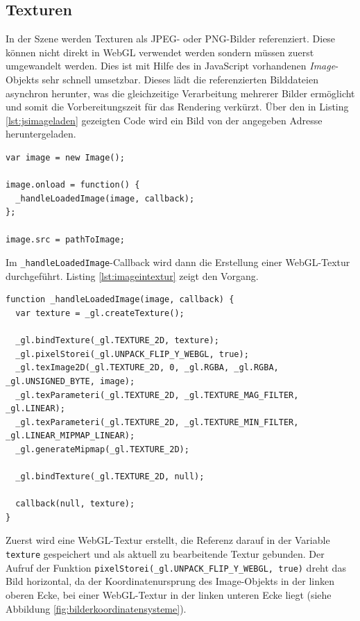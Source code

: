 \subsection{Texturen}
In der Szene werden Texturen als JPEG- oder PNG-Bilder referenziert. Diese können nicht direkt in WebGL verwendet werden sondern müssen zuerst umgewandelt werden. Dies ist mit Hilfe des in JavaScript vorhandenen \textit{Image}-Objekts sehr schnell umsetzbar. Dieses lädt die referenzierten Bilddateien asynchron herunter, was die gleichzeitige Verarbeitung mehrerer Bilder ermöglicht und somit die Vorbereitungszeit für das Rendering verkürzt. Über den in Listing \ref{lst:jsimageladen} gezeigten Code wird ein Bild von der angegeben Adresse heruntergeladen.
\lstset{language=JavaScript}
\begin{lstlisting}[caption={Herunterladen eines Bildes mit dem JavaScript Image-Objekt}, label={lst:jsimageladen}]
var image = new Image();

image.onload = function() {
  _handleLoadedImage(image, callback);
};

image.src = pathToImage;
\end{lstlisting}
Im \texttt{\_handleLoadedImage}-Callback wird dann die Erstellung einer WebGL-Textur durchgeführt. Listing \ref{lst:imageintextur} zeigt den Vorgang.
\lstset{language=JavaScript}
\begin{lstlisting}[caption={Umwandlung eines Image-Objekts in eine WebGL-Textur}, label={lst:imageintextur}]
function _handleLoadedImage(image, callback) {
  var texture = _gl.createTexture();

  _gl.bindTexture(_gl.TEXTURE_2D, texture);
  _gl.pixelStorei(_gl.UNPACK_FLIP_Y_WEBGL, true);
  _gl.texImage2D(_gl.TEXTURE_2D, 0, _gl.RGBA, _gl.RGBA, _gl.UNSIGNED_BYTE, image);
  _gl.texParameteri(_gl.TEXTURE_2D, _gl.TEXTURE_MAG_FILTER, _gl.LINEAR);
  _gl.texParameteri(_gl.TEXTURE_2D, _gl.TEXTURE_MIN_FILTER, _gl.LINEAR_MIPMAP_LINEAR);
  _gl.generateMipmap(_gl.TEXTURE_2D);

  _gl.bindTexture(_gl.TEXTURE_2D, null);

  callback(null, texture);
}
\end{lstlisting}
Zuerst wird eine WebGL-Textur erstellt, die Referenz darauf in der Variable \texttt{texture} gespeichert und als aktuell zu bearbeitende Textur gebunden. Der Aufruf der Funktion \texttt{pixelStorei(\_gl.UNPACK\-\_FLIP\-\_Y\-\_WEBGL, true)} dreht das Bild horizontal, da der Koordinatenursprung des Image-Objekts in der linken oberen Ecke, bei einer WebGL-Textur in der linken unteren Ecke liegt (siehe Abbildung \ref{fig:bilderkoordinatensysteme}).

